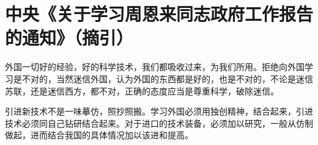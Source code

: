 \section[中央《关于学习周恩来同志政府工作报告的通知》（摘引）（一九六五年一月十四日）]{中央《关于学习周恩来同志政府工作报告的通知》（摘引）}


外国一切好的经验，好的科学技术，我们都吸收过来，为我们所用。拒绝向外国学习是不对的，当然迷信外国，认为外国的东西都是好的，也是不对的，不论是迷信苏联，还是迷信西方，都不对，正确的态度应当是尊重科学，破除迷信。

引进新技术不是一味摹仿，照抄照搬。学习外国必须用独创精神，结合起来，引进技术必须同自己钻研结合起来。对于进口的技术装备，必须加以研究，一般从仿制做起，进而结合我国的具体情况加以该进和提高。

